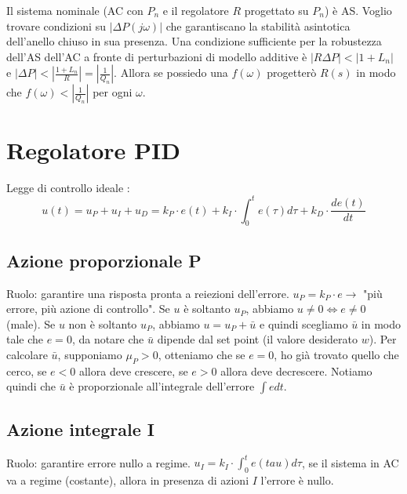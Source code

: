     Il sistema nominale (AC con $P_n$ e il regolatore $R$ progettato su $P_n$) è AS.\newline
    Voglio trovare condizioni su $|\Delta P (j \omega)|$ che garantiscano la stabilità asintotica dell'anello chiuso in sua presenza.\newline
    Una condizione sufficiente per la robustezza dell'AS dell'AC a fronte di perturbazioni di modello additive è $|R \Delta P| < |1 + L_n|$ e $|\Delta P| < | \frac{1 + L_n}{R}| = | \frac{1}{Q_n}|$.\newline
    Allora se possiedo una $f(\omega)$ progetterò $R(s)$ in modo che $f(\omega) < | \frac{1}{Q_n}| $ per ogni $\omega$.
    \newpage\section{Regolatore PID}
    Legge di controllo ideale :
    \[
        u(t) = u_P + u_I + u_D = k_P \cdot e(t) + k_I \cdot \int_{0}^{t}e(\tau)d \tau + k_D \cdot \frac{d e (t)}{dt}
    \]
    \subsection{Azione proporzionale P}
    Ruolo: garantire una risposta pronta a reiezioni dell'errore. \newline
    \newline
    $u_P = k_P \cdot e \rightarrow $ "più errore, più azione di controllo".\newline
    Se $u$ è soltanto $u_P$, abbiamo $u \neq 0 \Leftrightarrow e \neq 0$ (male).\newline
    Se $u$ non è soltanto $u_P$, abbiamo $u = u_P + \bar{u}$ e quindi scegliamo $\bar{u}$ in modo tale che $e = 0$, da notare che $\bar{u}$ dipende dal set point (il valore desiderato $w$).\newline
    Per calcolare $\bar{u}$, supponiamo $\mu_P > 0$, otteniamo che se $e= 0$, ho già trovato quello che cerco, se $e<0$ allora deve crescere, se $e>0$ allora deve decrescere. Notiamo quindi che $\bar{u}$ è proporzionale all'integrale dell'errore $\int e dt$.
    \subsection{Azione integrale I}
    Ruolo: garantire errore nullo a regime. \newline
    \newline
    $u_I = k_I \cdot \int_{0}^{t} e (tau) d \tau$, se il sistema in AC va a regime (costante), allora in presenza di azioni $I$ l'errore è nullo.
